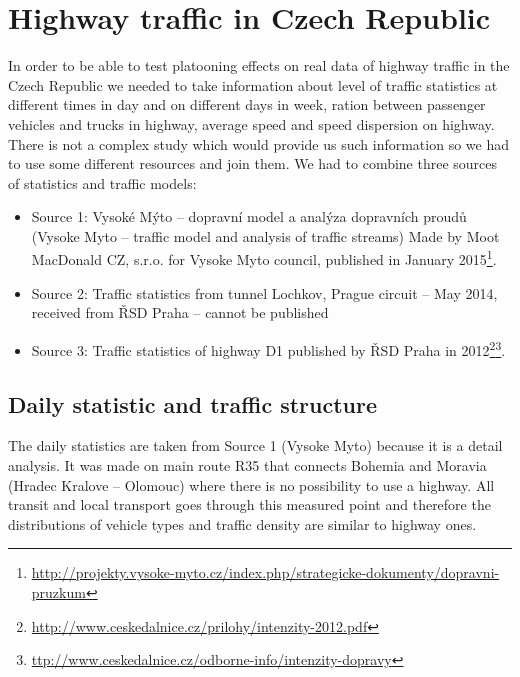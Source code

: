 \chapter{Highway traffic in Czech Republic}

In order to be able to test platooning effects on real data of highway traffic in the Czech Republic we needed to take information about level of traffic statistics at different times in day and on different days in week, ration between passenger vehicles and trucks in highway, average speed and speed dispersion on highway. There is not a complex study which would provide us such information so we had to use some different resources and join them. We had to combine three sources of statistics and traffic models:

\begin{itemize}
\item Source 1:	Vysoké Mýto –  dopravní model a analýza dopravních proudů (Vysoke Myto – traffic model and analysis of traffic streams) Made by Moot MacDonald CZ, s.r.o. for Vysoke Myto council, published in January 2015\footnote{\url{http://projekty.vysoke-myto.cz/index.php/strategicke-dokumenty/dopravni-pruzkum}}.
\item Source 2:	Traffic statistics from tunnel Lochkov, Prague circuit – May 2014, received from ŘSD Praha – cannot be published
\item Source 3:	Traffic statistics of highway D1 published by ŘSD Praha in 2012\footnote{\url{http://www.ceskedalnice.cz/prilohy/intenzity-2012.pdf}}\footnote{\url{ttp://www.ceskedalnice.cz/odborne-info/intenzity-dopravy}}.
\end{itemize}










\section{Daily statistic and traffic structure }

The daily statistics are taken from Source 1 (Vysoke Myto) because it is a detail analysis. It was made on main route R35 that connects Bohemia and Moravia (Hradec Kralove – Olomouc) where there is no possibility to use a highway. All transit and local transport goes through this measured point and therefore the distributions of vehicle types and traffic density are similar to highway ones.


